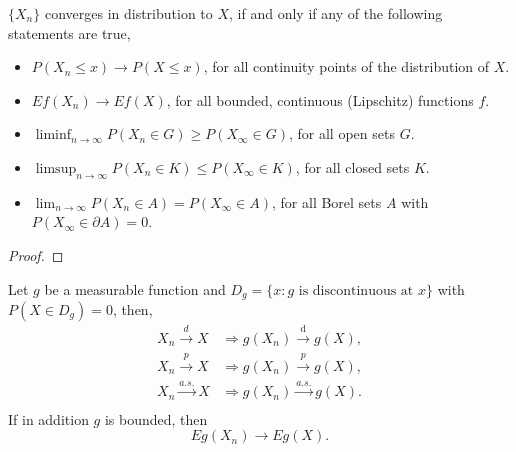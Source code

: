 \begin{theorem} \label{thm:portmanteau-lemma}
    $\{X_n\}$ converges in distribution to $X$, if and only if any of the following statements are true,
    \begin{itemize}
        \item $P(X_n\leq x)\rightarrow P(X\leq x)$, for all continuity points of the distribution of $X$.
        \item $Ef(X_n)\rightarrow Ef(X)$, for all bounded, continuous (Lipschitz) functions $f$.
        \item $\liminf_{n\rightarrow\infty}P\left(X_{n} \in G\right)\geq P\left(X_{\infty}\in G\right)$, for all open sets $G$.
        \item $\limsup_{n \rightarrow\infty}P\left(X_{n} \in K\right) \leq P\left(X_{\infty} \in K\right)$, for all closed sets $K$.
        \item $\lim_{n\rightarrow\infty}P\left(X_{n}\in A\right)=P\left(X_{\infty}\in A\right)$, for all Borel sets $A$ with $P\left(X_{\infty}\in \partial A\right)=0$.
    \end{itemize}
\end{theorem}

\begin{proof}

\end{proof}

\begin{theorem} \label{thm:continuous-mapping-theorem}
    Let $g$ be a measurable function and $D_g=\{x:g \text{ is discontinuous at } x\}$ with $P(X\in D_g)=0$, then,
    \begin{equation}
        \begin{aligned}
            X_{n} \stackrel{d}{\rightarrow} X    & \Rightarrow g\left(X_{n}\right) \stackrel{\mathrm{d}}{\rightarrow} g(X), \\
            X_{n} \stackrel{p}{\rightarrow} X    & \Rightarrow g\left(X_{n}\right) \stackrel{p}{\rightarrow} g(X),          \\
            X_{n} \stackrel{a.s.}{\rightarrow} X & \Rightarrow g\left(X_{n}\right) \stackrel{a.s.}{\rightarrow} g(X).       \\
        \end{aligned}
    \end{equation}
    If in addition $g$ is bounded, then
    \begin{equation}
        Eg(X_n)\rightarrow Eg(X).
    \end{equation}
\end{theorem}

